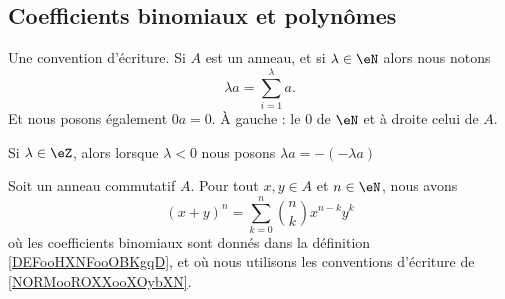 \subsection{Coefficients binomiaux et polynômes}

\begin{normaltext}		\label{NORMooROXXooXOybXN}
	Une convention d'écriture. Si \( A\) est un anneau, et si \( \lambda\in \eN\) alors nous notons
	\begin{equation}
		\lambda a=\sum_{i=1}^{\lambda}a.
	\end{equation}
	Et nous posons également \( 0a=0\). À gauche : le \( 0\) de \( \eN\) et à droite celui de \( A\).

	Si \( \lambda\in \eZ\), alors lorsque \( \lambda<0\) nous posons \( \lambda a=  -(-\lambda a)  \)
\end{normaltext}


\begin{proposition}     \label{PropBinomFExOiL}
	Soit un anneau commutatif \( A\). Pour tout \( x,y\in A\) et \( n\in \eN\), nous avons
	\begin{equation}        \label{EqNewtonB}
		(x+y)^n=\sum_{k=0}^n{n\choose k}x^{n-k}y^k
	\end{equation}
	où les coefficients binomiaux sont donnés dans la définition \ref{DEFooHXNFooOBKgqD}, et où nous utilisons les conventions d'écriture de \ref{NORMooROXXooXOybXN}.
\end{proposition}

